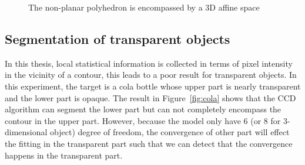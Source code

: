 \begin{figure}[htbp]
\begin{minipage}[t]{0.5\linewidth}
  \end{minipage} 
  \begin{minipage}[t]{0.5\linewidth} 
    \centering 
  \end{minipage} 
\caption[Three-dimensional affine shape-space for rigid object]{The
  non-planar polyhedron is encompassed by a 3D affine space}
\label{fig:container}
\end{figure}

\subsection{Segmentation of transparent objects}
\label{sec:sto}
In this thesis, local statistical information is collected in terms of
pixel intensity in the vicinity of a contour, this leads to a poor
result for transparent objects. In this experiment, the
target is a cola bottle whose upper part is nearly transparent and the
lower part is opaque. The result in Figure~\ref{fig:cola} shows that the CCD algorithm
can segment the lower part but can not completely encompass the contour in the
upper part. However, because the model only have 6 (or 8
for 3-dimensional object) degree of freedom, the convergence of other
part will effect the fitting in the transparent part such that we can
detect that the convergence happens in the transparent part.


